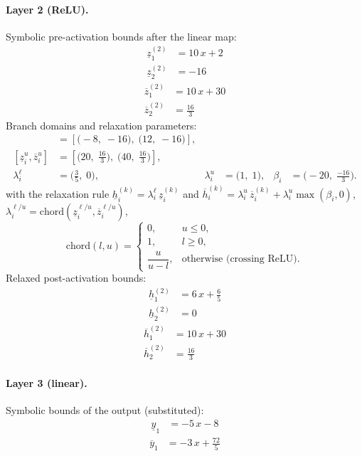 \documentclass[11pt]{article}
\begin{document}
\paragraph{Layer 2 (ReLU).}
Symbolic pre-activation bounds after the linear map:
\begin{align*}
\underline{z}^{(2)}_{1} &= 10\,x + 2 \\
\underline{z}^{(2)}_{2} &= -16
\end{align*}
\begin{align*}
\overline{z}^{(2)}_{1} &= 10\,x + 30 \\
\overline{z}^{(2)}_{2} &= \frac{16}{3}
\end{align*}
Branch domains and relaxation parameters:
\begin{align*}
[\underline{z}^{\ell}_i, \overline{z}^{\ell}_i] &= [\bigl(-8,\; -16\bigr),\; \bigl(12,\; -16\bigr)], \\ 
[\underline{z}^{u}_i, \overline{z}^{u}_i] &= [\bigl(20,\; \frac{16}{3}\bigr),\; \bigl(40,\; \frac{16}{3}\bigr)], \\
\lambda^{\ell}_i &= \bigl(\frac{3}{5},\; 0\bigr), & \lambda^{u}_i &= \bigl(1,\; 1\bigr), & \beta_i &= \bigl(-20,\; \frac{-16}{3}\bigr).
\end{align*}
with the relaxation rule
$\underline{h}^{(k)}_i = \lambda^{\ell}_i\, \underline{z}^{(k)}_i$ and
$\overline{h}^{(k)}_i = \lambda^{u}_i\, \overline{z}^{(k)}_i + \lambda^{u}_i \max(\beta_i, 0)$,
$\lambda^{\ell/u}_i = \mathrm{chord}(\underline{z}_i^{\ell/u}, \overline{z}_i^{\ell/u})$,
\[
\mathrm{chord}(l, u) =
\begin{cases}
0, & u \le 0,\\
1, & l \ge 0,\\
\dfrac{u}{u - l}, & \text{otherwise (crossing ReLU)}.
\end{cases}\]
Relaxed post-activation bounds:
\begin{align*}
\underline{h}^{(2)}_{1} &= 6\,x + \frac{6}{5} \\
\underline{h}^{(2)}_{2} &= 0
\end{align*}
\begin{align*}
\overline{h}^{(2)}_{1} &= 10\,x + 30 \\
\overline{h}^{(2)}_{2} &= \frac{16}{3}
\end{align*}
\paragraph{Layer 3 (linear).}
Symbolic bounds of the output (substituted):
\begin{align*}
\underline{y}_{1} &= -5\,x - 8
\end{align*}
\begin{align*}
\overline{y}_{1} &= -3\,x + \frac{72}{5}
\end{align*}
\end{document}
